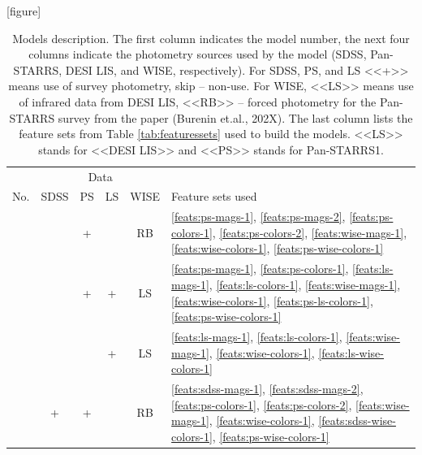 \documentclass[fleqn,usenatbib]{mnras}
\begin{document}
\begin{table}
    \caption{Models description. The first column indicates the model number, the next four columns indicate the photometry sources used by the model (SDSS, Pan-STARRS, DESI LIS, and WISE, respectively). For SDSS, PS, and LS <<+>> means use of survey photometry, skip -- non-use. For WISE, <<LS>> means use of infrared data from DESI LIS, <<RB>> -- forced photometry for the Pan-STARRS survey from the paper (Burenin et.al., 202X). The last column lists the feature sets from Table \ref{tab:featuressets} used to build the models. <<LS>> stands for <<DESI LIS>> and <<PS>> stands for Pan-STARRS1.}
    \label{tab:models}
    \centering
    [figure] 
    \renewcommand{\theModelNumber}{\arabic{ModelNumber}}
    \setcounter{ModelNumber}{0}
    \begin{tabular}{r c c c c l}
    \hline
        {}                      & \multicolumn{4}{c}{Data} & {}\\
        No. & SDSS & PS & LS & WISE & Feature sets used \\
    \hline
        {ModelNumber}\theModelNumber\label{model:pw} & & + & & RB & \ref{feats:ps-mags-1}, \ref{feats:ps-mags-2}, \ref{feats:ps-colors-1}, \ref{feats:ps-colors-2}, \ref{feats:wise-mags-1}, \ref{feats:wise-colors-1}, \ref{feats:ps-wise-colors-1} \\ %
        {ModelNumber}\theModelNumber\label{model:pdw} & & + & + & LS & \ref{feats:ps-mags-1}, \ref{feats:ps-colors-1}, \ref{feats:ls-mags-1}, \ref{feats:ls-colors-1}, \ref{feats:wise-mags-1}, \ref{feats:wise-colors-1}, \ref{feats:ps-ls-colors-1}, \ref{feats:ps-wise-colors-1} \\ %
        {ModelNumber}\theModelNumber\label{model:dw} & & & + & LS & \ref{feats:ls-mags-1}, \ref{feats:ls-colors-1}, \ref{feats:wise-mags-1}, \ref{feats:wise-colors-1}, \ref{feats:ls-wise-colors-1} \\ %
        {ModelNumber}\theModelNumber\label{model:spw} & + & + & & RB & \ref{feats:sdss-mags-1}, \ref{feats:sdss-mags-2}, \ref{feats:ps-colors-1}, \ref{feats:ps-colors-2}, \ref{feats:wise-mags-1}, \ref{feats:wise-colors-1}, \ref{feats:sdss-wise-colors-1}, \ref{feats:ps-wise-colors-1} \\

\end{tabular}
\end{table}
\end{document}
